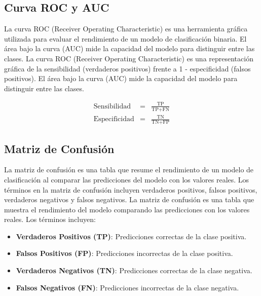 \documentclass[a4paper]{report} %
\begin{document}
\subsection{Curva ROC y AUC}
La curva ROC (Receiver Operating Characteristic) es una herramienta gr\'afica utilizada para evaluar el rendimiento de un modelo de clasificaci\'on binaria. El \'area bajo la curva (AUC) mide la capacidad del modelo para distinguir entre las clases. 
La curva ROC (Receiver Operating Characteristic) es una representaci\'on gr\'afica de la sensibilidad (verdaderos positivos) frente a 1 - especificidad (falsos positivos). El \'area bajo la curva (AUC) mide la capacidad del modelo para distinguir entre las clases.

\begin{eqnarray}
\text{Sensibilidad} &=& \frac{\text{TP}}{\text{TP} + \text{FN}} \\
\text{Especificidad} &=& \frac{\text{TN}}{\text{TN} + \text{FP}}
\end{eqnarray}



\subsection{Matriz de Confusi\'on}
La matriz de confusi\'on es una tabla que resume el rendimiento de un modelo de clasificaci\'on al comparar las predicciones del modelo con los valores reales. Los t\'erminos en la matriz de confusi\'on incluyen verdaderos positivos, falsos positivos, verdaderos negativos y falsos negativos. 
La matriz de confusi\'on es una tabla que muestra el rendimiento del modelo comparando las predicciones con los valores reales. Los t\'erminos incluyen:
\begin{itemize}
    \item \textbf{Verdaderos Positivos (TP)}: Predicciones correctas de la clase positiva.
    \item \textbf{Falsos Positivos (FP)}: Predicciones incorrectas de la clase positiva.
    \item \textbf{Verdaderos Negativos (TN)}: Predicciones correctas de la clase negativa.
    \item \textbf{Falsos Negativos (FN)}: Predicciones incorrectas de la clase negativa.
\end{itemize}
\end{document}
